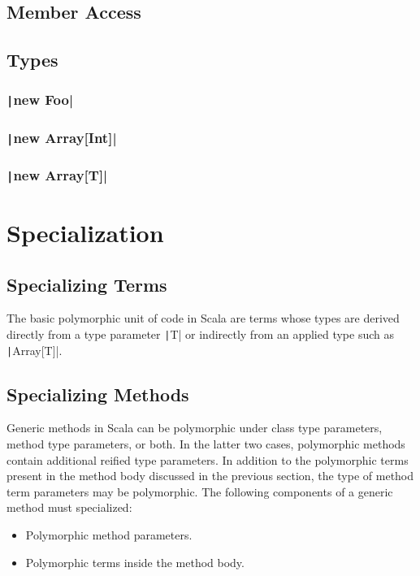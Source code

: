 \subsection*{Member Access}

\subsection*{Types}

\subsubsection{\texttt|new Foo|}

\subsubsection{\texttt|new Array[Int]|}

\subsubsection{\texttt|new Array[T]|}

\section{Specialization}


\subsection{Specializing Terms}

The basic polymorphic unit of code in Scala are terms whose types are derived directly from a type parameter \texttt|T| or indirectly from an applied type such as \texttt|Array[T]|.


\subsection{Specializing Methods}

Generic methods in Scala can be polymorphic under class type parameters, method type parameters, or both. In the latter two cases, polymorphic methods contain additional reified type parameters. In addition to the polymorphic terms present in the method body discussed in the previous section, the type of method term parameters may be polymorphic. The following components of a generic method must specialized:

\begin{itemize}
	\item Polymorphic method parameters.
	\item Polymorphic terms inside the method body.
\end{itemize}



